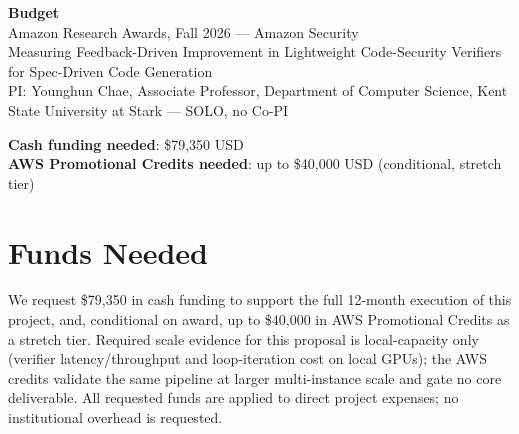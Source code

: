 \documentclass[11pt]{article}
\begin{document}
\begin{center}
{\Large\bfseries Budget}\\[2pt]
{\large Amazon Research Awards, Fall 2026 --- Amazon Security}\\[2pt]
{\large Measuring Feedback-Driven Improvement in Lightweight Code-Security Verifiers for Spec-Driven Code Generation}\\[2pt]
PI: Younghun Chae, Associate Professor, Department of Computer Science, Kent State University at Stark --- SOLO, no Co-PI
\end{center}

\bigskip
\noindent\textbf{Cash funding needed}: \$79,350 USD \\
\textbf{AWS Promotional Credits needed}: up to \$40,000 USD (conditional, stretch tier)

\bigskip
\section*{Funds Needed}
We request \$79,350 in cash funding to support the full 12-month execution of this project, and, conditional on award, up to \$40,000 in AWS Promotional Credits as a stretch tier. Required scale evidence for this proposal is local-capacity only (verifier latency/throughput and loop-iteration cost on local GPUs); the AWS credits validate the same pipeline at larger multi-instance scale and gate no core deliverable. All requested funds are applied to direct project expenses; no institutional overhead is requested.
\end{document}
